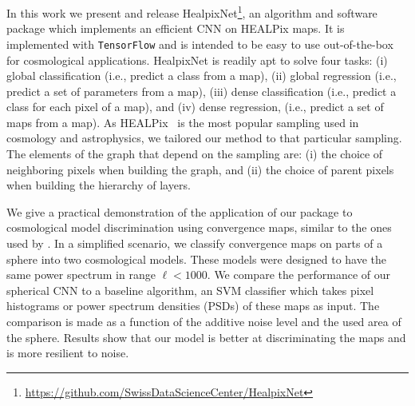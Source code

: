 \documentclass[final,twocolumn,3p,times,authoryear]{elsarticle}
\newcommand{\nati}[1]{{\color[rgb]{.1,.6,.1}{#1}}}
\newcommand{\TK}[1]{{\color{red}{TK:#1}}}
\newcommand{\todo}[1]{{\color[rgb]{.6,.1,.6}{#1}}}
\newcommand{\1}{\b{1}}              %
\newcommand{\0}{\b{0}}              %
\newcommand{\pkg}[1]{\texttt{#1}}
\begin{document}
In this work we present and release HealpixNet\footnote{\url{https://github.com/SwissDataScienceCenter/HealpixNet}}, an algorithm and software package which implements an efficient CNN on HEALPix maps. It is implemented with \pkg{TensorFlow} \citep{abadi2016tensorflow} and is intended to be easy to use out-of-the-box for cosmological applications.
HealpixNet is readily apt to solve four tasks: (i) global classification (i.e., predict a class from a map), (ii) global regression (i.e., predict a set of parameters from a map), (iii) dense classification (i.e., predict a class for each pixel of a map), and (iv) dense regression, (i.e., predict a set of maps from a map).
As HEALPix~\citep{gorski2005healpix} is the most popular sampling used in cosmology and astrophysics, we tailored our method to that particular sampling.
The elements of the graph that depend on the sampling are:
(i) the choice of neighboring pixels when building the graph, and
(ii) the choice of parent pixels when building the hierarchy of layers.

We give a practical demonstration of the application of our package to cosmological model discrimination using convergence maps, similar to the ones used by \citet{schmelze2017cosmologicalmodel}.
In a simplified scenario, we classify convergence maps on parts of a sphere into two cosmological models.
These models were designed to have the same power spectrum in range $\ell < 1000$.
We compare the performance of our spherical CNN to a baseline algorithm, an SVM classifier which takes pixel histograms or power spectrum densities (PSDs) of these maps as input.
The comparison is made as a function of the additive noise level and the used area of the sphere. Results show that our model is better at discriminating the maps and is more resilient to noise.
\end{document}
